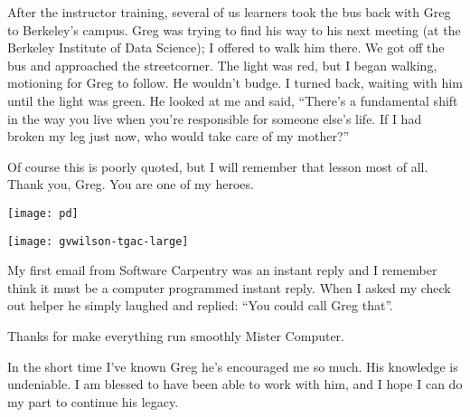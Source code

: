 \begin{center}
\begin{minipage}{0.45\textwidth}
\setlength{\parindent}{0in}
\setlength{\parskip}{1em}

After the instructor training, several of us learners took the bus back with
Greg to Berkeley's campus. Greg was trying to find his way to his next meeting
(at the Berkeley Institute of Data Science); I offered to walk him there. We
got off the bus and approached the streetcorner. The light was red, but I began
walking, motioning for Greg to follow. He wouldn't budge. I turned back,
waiting with him until the light was green. He looked at me and said, ``There's
a fundamental shift in the way you live when you're responsible for someone
else's life. If I had broken my leg just now, who would take care of my
mother?''

Of course this is poorly quoted, but I will remember that lesson most of all.
Thank you, Greg. You are one of my heroes.

\end{minipage}
\hfill
\begin{minipage}{0.45\textwidth}
    \texttt{[image: pd]}
\end{minipage}
\end{center}
\vspace*{\fill}

\newpage

\vspace*{\fill}

\begin{center}
\texttt{[image: gvwilson-tgac-large]}
\end{center}

My first email from Software Carpentry was an instant reply and I remember
think it must be a computer programmed instant reply. When I asked my check out
helper he simply laughed and replied: ``You could call Greg that''. 

Thanks for make everything run smoothly Mister Computer.


In the short time I've known Greg he's encouraged me so much. His knowledge is
undeniable. I am blessed to have been able to work with him, and I hope I can
do my part to continue his legacy.

\vspace*{\fill}

